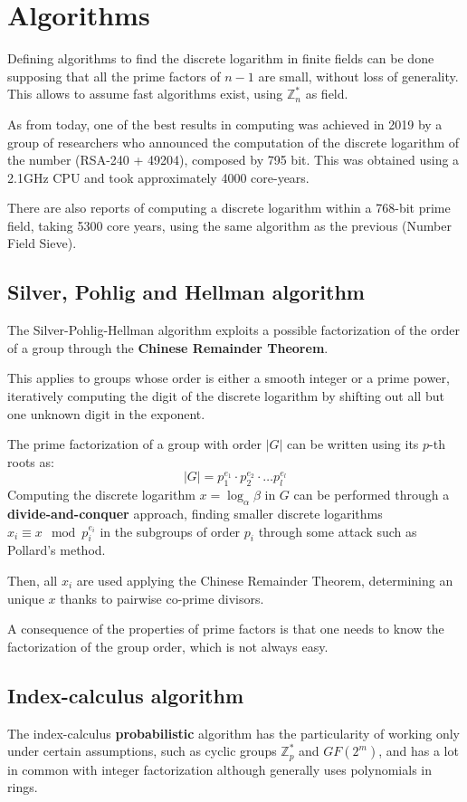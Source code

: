 \section{Algorithms}
Defining algorithms to find the discrete logarithm in finite fields can be done supposing that all the prime factors of $n - 1$ are small, without loss of generality. This allows to assume fast algorithms exist, using $\mathbb{Z}^*_n$ as field.

As from today, one of the best results in computing was achieved in 2019 by a group of researchers who announced the computation of the discrete logarithm of the number (RSA-240 + 49204), composed by 795 bit. This was obtained using a 2.1GHz CPU and took approximately 4000 core-years.

There are also reports of computing a discrete logarithm within a 768-bit prime field, taking 5300 core years, using the same algorithm as the previous (Number Field Sieve).

\subsection{Silver, Pohlig and Hellman algorithm}
The Silver-Pohlig-Hellman algorithm exploits a possible factorization of the order of a group through the \textbf{Chinese Remainder Theorem}. 

This applies to groups whose order is either a smooth integer or a prime power, iteratively computing the digit of the discrete logarithm by shifting out all but one unknown digit in the exponent.

The prime factorization of a group with order $|G|$ can be written using its $p$-th roots as:
$$|G| = p_1^{e_1} \cdot p_2^{e_2} \cdot \dots p_l^{e_l}$$
Computing the discrete logarithm $x = \log_\alpha \beta$ in $G$ can be performed through a \textbf{divide-and-conquer} approach, finding smaller discrete logarithms $x_i \equiv x \mod p_i^{e_i}$ in the subgroups of order $p_i$ through some attack such as Pollard's method.

Then, all $x_i$ are used applying the Chinese Remainder Theorem, determining an unique $x$ thanks to pairwise co-prime divisors. 

A consequence of the properties of prime factors is that one needs to know the factorization of the group order, which is not always easy.

\subsection{Index-calculus algorithm}
The index-calculus \textbf{probabilistic} algorithm has the particularity of working only under certain assumptions, such as cyclic groups $\mathbb{Z}^*_p$ and $GF(2^m)$, and has a lot in common with integer factorization although generally uses polynomials in rings. 


